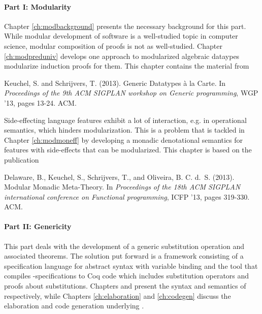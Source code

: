 {\paragraph{Part I: Modularity}

Chapter \ref{ch:modbackground} presents the necessary background for this
part. While modular development of software is a well-studied topic in computer
science, modular composition of proofs is not as well-studied. Chapter
\ref{ch:modpreduniv} develops one approach to modularized algebraic dataypes
modularize induction proofs for them. This chapter contains the material from

\begin{center}
  \begin{minipage}{0.85\columnwidth}
    Keuchel, S. and Schrijvers, T. (2013).
    \newblock Generic Datatypes \`a la Carte.
    \newblock In {\em Proceedings of the 9th ACM SIGPLAN workshop on Generic
      programming}, WGP ’13, pages 13-24. ACM.
  \end{minipage}
\end{center}

Side-effecting language features exhibit a lot of interaction, e.g. in
operational semantics, which hinders modularization. This is a problem that is
tackled in Chapter \ref{ch:modmoneff} by developing a monadic denotational
semantics for features with side-effects that can be modularized. This chapter
is based on the publication

\begin{center}
  \begin{minipage}{0.85\columnwidth}
    Delaware, B., Keuchel, S., Schrijvers, T., and Oliveira,
    B. C. d.~S. (2013).
    \newblock Modular Monadic Meta-Theory.
    \newblock In {\em Proceedings of the 18th ACM SIGPLAN international
      conference on Functional programming}, ICFP '13, pages 319-330. ACM.
  \end{minipage}
\end{center}


\paragraph{Part II: Genericity}
This part deals with the development of a generic substitution operation and
associated theorems. The solution put forward is a framework consisting of a
specification language \Knot for abstract syntax with variable binding and the
tool \Needle that compiles \Knot-specifications to Coq code which includes
substitution operators and proofs about
substitutions. Chapters \label{ch:knotsyntax} and \label{ch:knotsemantics}
present the syntax and semantics of \Knot respectively, while Chapters
\ref{ch:elaboration} and \ref{ch:codegen} discuss the elaboration and code
generation underlying \Needle.

}

